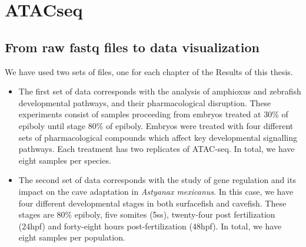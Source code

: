 \section{ATACseq}

\subsection{From raw fastq files to data visualization}

We have used two sets of files, one for each chapter of the Results of this thesis. 
\begin{itemize}
    \item The first set of data corresponds with the analysis of amphioxus and zebrafish developmental pathways, and their pharmacological disruption. These experiments consist of samples proceeding from embryos treated at 30\% of epiboly until stage 80\% of epiboly. Embryos were treated with four different sets of pharmacological compounds which affect key developmental signalling pathways. Each treatment has two replicates of ATAC-seq. In total, we have eight samples per species.
    \item The second set of data corresponds with the study of gene regulation and its impact on the cave adaptation in \textit{Astyanax mexicanus}. In this case, we have four different developmental stages in both surfacefish and cavefish. These stages are 80\% epiboly, five somites (5ss), twenty-four post fertilization (24hpf) and forty-eight hours post-fertilization (48hpf). In total, we have eight samples per population.
\end{itemize}


